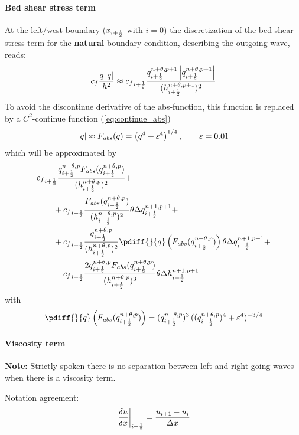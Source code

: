 \paragraph*{Bed shear stress term}
At the left/west boundary ($x_{i+\frac{1}{2}}$ with $i=0$) the discretization of the bed shear stress term for the \textbf{natural} boundary condition, describing the outgoing wave, reads:
\begin{align}
    c_f \frac{q\left\lvert q \right\rvert}{h^2} \approx
    {c_f}_{i+\frac{1}{2}} \frac{q^{n+\theta,p+1}_{i+\frac{1}{2}}\left\lvert q^{n+\theta,p+1}_{i+\frac{1}{2}} \right\rvert}{(h^{n+\theta,p+1}_{i+\frac{1}{2}})^2}
\end{align}
To avoid the discontinue derivative of the abs-function, this function is replaced by a $C^2$-continue function (\autoref{eq:continue_abs})
%
\begin{align}
    \left\lvert q \right\rvert \approx F_{\mathit abs}(q) = \left( q^4 + \varepsilon^4 \right)^{1/4}, \qquad \varepsilon = 0.01
\end{align}
which will be approximated by
\begin{align}
    & {c_f}_{i+\half} \frac{q^{n+\theta,p}_{i+\half}\Fabs{q^{n+\theta,p}_{i+\half}}}{(h^{n+\theta,p}_{i+\half})^2}
    +
    \nonumber \\*
    & \qquad + {c_f}_{i+\half} \frac{\Fabs{q^{n+\theta,p}_{i+\half}}}{(h^{n+\theta,p}_{i+\half})^2} \theta \Delta q^{n+1,p+1}_{i+\half}
    +
    \nonumber \\*
    & \qquad + {c_f}_{i+\half} \frac{q^{n+\theta,p}_{i+\half}}{(h^{n+\theta,p}_{i+\half})^2} \pdiff{}{q}\left(\Fabs{q^{n+\theta,p}_{i+\half}}\right)  \theta \Delta q^{n+1,p+1}_{i+\half}
    +
    \nonumber \\*
    & \qquad - {c_f}_{i+\half} \frac{2 q^{n+\theta,p}_{i+\half}\Fabs{q^{n+\theta,p}_{i+\half}}}{(h^{n+\theta,p}_{i+\half})^3} \theta \Delta h^{n+1,p+1}_{i+\half}
\end{align}
with
\begin{align}
    \pdiff{}{q}\left(\Fabs{q^{n+\theta,p}_{i+\half}}\right) =
    (q^{n+\theta, p}_{i+\half})^3\,((q^{n+\theta, p}_{i+\half})^4 + \eps^4)^{-3/4}
\end{align}
\paragraph*{Viscosity term}
\textbf{Note:}
Strictly spoken there is no separation between left and right going waves when there is a viscosity term.
%

Notation agreement:
\begin{align}
    \left. \frac{\delta u}{\delta x}\right|_{i+\frac{1}{2}} = \frac{u_{i+1} - u_{i}}{\Delta x}
\end{align}

